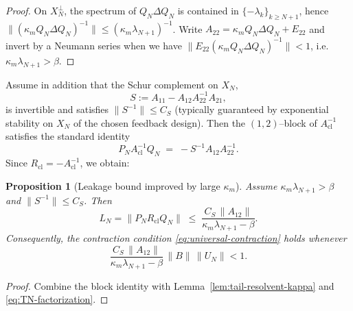 \documentclass[11pt,a4paper]{article}
\numberwithin{equation}{section}
\newtheorem{proposition}[theorem]{Proposition}
\theoremstyle{definition}
\newcommand{\1}{\mathbbm{1}}
\begin{document}
\begin{proof}
On $X_N^\perp$, the spectrum of $Q_N\Delta Q_N$ is contained in $\{-\lambda_k\}_{k\ge N+1}$, hence
$\|(\kappa_m Q_N\Delta Q_N)^{-1}\|\le (\kappa_m\lambda_{N+1})^{-1}$.
Write $A_{22}=\kappa_m Q_N\Delta Q_N + E_{22}$ and invert by a Neumann series when we have 
$\|E_{22}(\kappa_m Q_N\Delta Q_N)^{-1}\|<1$, i.e. $\kappa_m\lambda_{N+1}>\beta$.
\end{proof}
\noindent
Assume in addition that the Schur complement on $X_N$,
\[
S:=A_{11}-A_{12}A_{22}^{-1}A_{21},
\]
is invertible and satisfies $\|S^{-1}\|\le C_S$ (typically guaranteed by exponential stability on $X_N$ of the chosen feedback design).
Then the $(1,2)$--block of $A_{\mathrm{cl}}^{-1}$ satisfies the standard identity
\[
P_N A_{\mathrm{cl}}^{-1} Q_N \;=\; -S^{-1}A_{12}A_{22}^{-1}.
\]
Since $R_{\mathrm{cl}}=-A_{\mathrm{cl}}^{-1}$, we obtain:

\begin{proposition}[Leakage bound improved by large $\kappa_m$]
\label{prop:leakage-kappa}
Assume $\kappa_m\lambda_{N+1}>\beta$ and $\|S^{-1}\|\le C_S$. Then
\begin{equation}
\label{eq:leakage-kappa}
L_N=\|P_N R_{\mathrm{cl}}Q_N\|
\;\le\;
\frac{C_S\,\|A_{12}\|}{\kappa_m\lambda_{N+1}-\beta}.
\end{equation}
Consequently, the contraction condition \eqref{eq:universal-contraction} holds whenever
\begin{equation}
\label{eq:kappa-threshold-final}
\frac{C_S\,\|A_{12}\|}{\kappa_m\lambda_{N+1}-\beta}\,\|B\|\,\|U_N\|<1.
\end{equation}
\end{proposition}

\begin{proof}
Combine the block identity with Lemma~\ref{lem:tail-resolvent-kappa} and \eqref{eq:TN-factorization}.
\end{proof}

\end{document}
